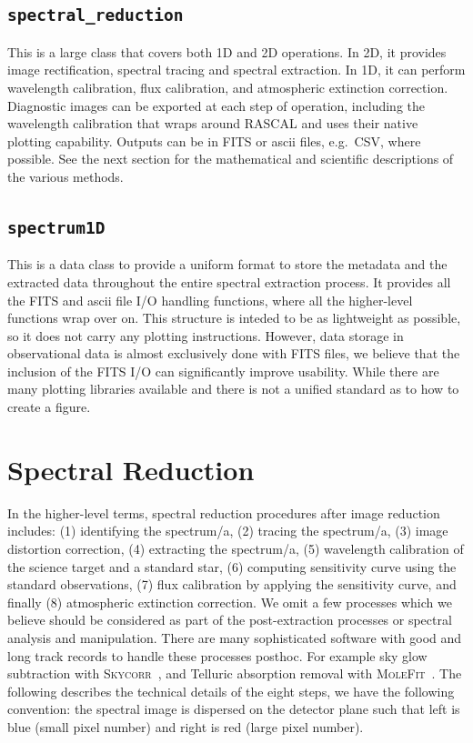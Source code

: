 \documentclass[fleqn,usenatbib]{mnras}
\begin{document}
\subsection*{\texttt{spectral\_reduction}}
This is a large class that covers both 1D and 2D operations. In 2D, it
provides image rectification, spectral tracing and spectral extraction.
In 1D, it can perform wavelength calibration, flux calibration, and atmospheric
extinction correction. Diagnostic images can be exported at each step
of operation, including the wavelength calibration that wraps around
\textsc{RASCAL} and uses their native plotting capability. Outputs can
be in FITS or ascii files, e.g.\ CSV, where possible. See the next
section for the mathematical and scientific descriptions of the various
methods.

\subsection*{\texttt{spectrum1D}}
This is a data class to provide a uniform format to store the metadata
and the extracted data throughout the entire spectral extraction process.
It provides all the FITS and ascii file I/O handling functions, where all
the higher-level functions wrap over on. This
structure is inteded to be as lightweight as possible, so it does not carry any plotting
instructions. However, data storage in observational data is almost
exclusively done with FITS files, we believe that the inclusion of the
FITS I/O can significantly improve usability. While there are many
plotting libraries available and there is not a unified standard
as to how to create a figure.

\section{Spectral Reduction}
In the higher-level terms, spectral reduction procedures after image
reduction includes: (1) identifying the spectrum/a, (2) tracing the
spectrum/a, (3) image distortion correction, (4) extracting the
spectrum/a, (5) wavelength calibration of the science target and a
standard star, (6) computing sensitivity curve using the standard
observations, (7) flux calibration by applying the sensitivity curve,
and finally (8) atmospheric extinction correction. We omit a few
processes which we believe should be considered as part of the
post-extraction processes or spectral analysis and manipulation.
There are many sophisticated software with good and long track records
to handle these processes posthoc. For example sky glow subtraction
with \textsc{Skycorr}~\citep{2014A&A...567A..25N}, and Telluric
absorption removal with
\textsc{MoleFit}~\citep{2015A&A...576A..77S, 2015A&A...576A..78K}.
The following describes the technical details of the eight steps,
we have the following convention: the spectral image is dispersed
on the detector plane such that left is blue (small pixel number)
and right is red (large pixel number).
\end{document}
